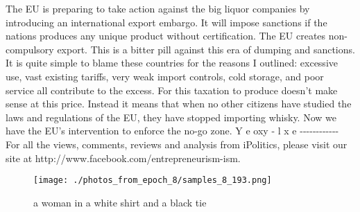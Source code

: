 \documentclass{article}%
\begin{document}
The EU is preparing to take action against the big liquor companies by introducing an international export embargo. It will impose sanctions if the nations produces any unique product without certification. The EU creates non{-}compulsory export.\newline%
This is a bitter pill against this era of dumping and sanctions. It is quite simple to blame these countries for the reasons I outlined: excessive use, vast existing tariffs, very weak import controls, cold storage, and poor service all contribute to the excess.\newline%
For this taxation to produce doesn't make sense at this price. Instead it means that when no other citizens have studied the laws and regulations of the EU, they have stopped importing whisky. Now we have the EU's intervention to enforce the no{-}go zone.\newline%
Y\newline%
e\newline%
oxy {-} l\newline%
x\newline%
e\newline%
{-}{-}{-}{-}{-}{-}{-}{-}{-}{-}{-}{-}\newline%
For all the views, comments, reviews and analysis from iPolitics, please visit our site at http://www.facebook.com/entrepreneurism{-}ism.\newline%

%


\begin{figure}[h!]%
\centering%
\texttt{[image: ./photos\_from\_epoch\_8/samples\_8\_193.png]}%
\caption{a woman in a white shirt and a black tie}%
\end{figure}

%
\end{document}
